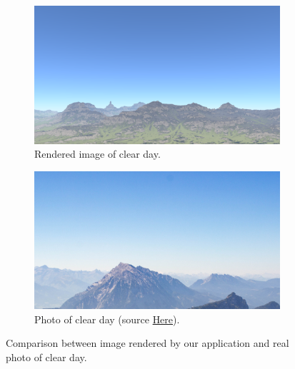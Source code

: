 \documentclass{ctuthesis}
\begin{document}
\begin{figure}[h]
     \centering
     \begin{subfigure}[b]{0.49\textwidth}
         \centering
         \includegraphics[width=\textwidth]{media/atmosphere_day.png}
         \caption{Rendered image of clear day.}
         \label{fig:Render of atmosphere during day}
     \end{subfigure}
     \hfill
     \begin{subfigure}[b]{0.49\textwidth}
         \centering
         \includegraphics[width=\textwidth]{media/atmosphere_day_real.png}
         \caption{Photo of clear day (source \href{https://wallup.net/preview/?wallpaper=landscape-mountains-clear-sky}{Here}).}
         \label{fig:Photo of atmosphere during day}
     \end{subfigure}
     \hfill
        \caption{Comparison between image rendered by our application and real photo of clear day.}
        \label{fig:Atmosphere day comparison}
\end{figure}
\end{document}
